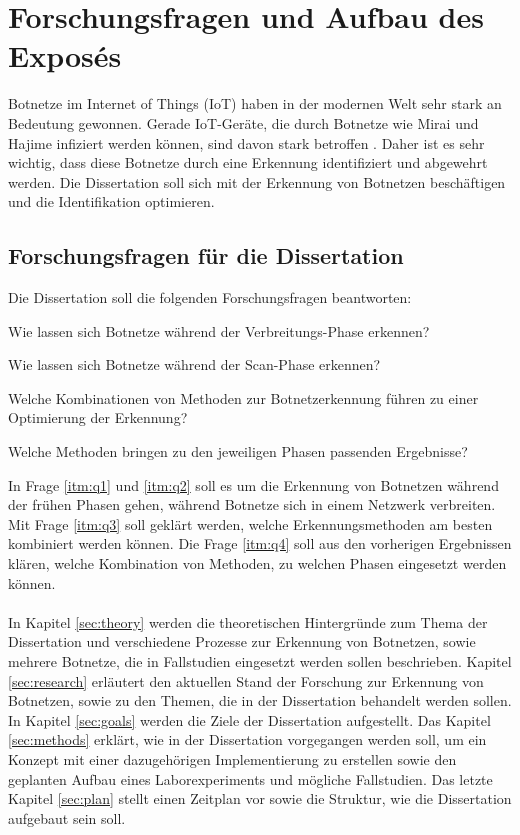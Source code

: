\section{Forschungsfragen und Aufbau des Exposés}

Botnetze im Internet of Things (IoT) haben in der modernen Welt sehr stark an Bedeutung gewonnen. Gerade IoT-Geräte, die
durch Botnetze wie Mirai und Hajime infiziert werden können, sind davon stark betroffen \cite{DBLP:conf/uss/AntonakakisABBB17}.
Daher ist es sehr wichtig, dass diese Botnetze durch eine Erkennung identifiziert und abgewehrt werden. Die Dissertation soll 
sich mit der Erkennung von Botnetzen beschäftigen und die Identifikation optimieren.

\subsection*{Forschungsfragen für die Dissertation}


Die Dissertation soll die folgenden Forschungsfragen beantworten:  

\begin{questions}
    \item Wie lassen sich Botnetze während der Verbreitungs-Phase erkennen? \label{itm:q1}
    \item Wie lassen sich Botnetze während der Scan-Phase erkennen? \label{itm:q2}
    \item Welche Kombinationen von Methoden zur Botnetzerkennung führen zu einer Optimierung der Erkennung? \label{itm:q3}
    \item Welche Methoden bringen zu den jeweiligen Phasen passenden Ergebnisse? \label{itm:q4}
\end{questions}

In Frage \ref{itm:q1} und \ref{itm:q2} soll es um die Erkennung von Botnetzen während der frühen Phasen gehen, während Botnetze sich in einem Netzwerk verbreiten. Mit Frage
\ref{itm:q3} soll geklärt werden, welche Erkennungsmethoden am besten kombiniert werden können. Die Frage \ref{itm:q4} soll aus den vorherigen Ergebnissen klären, welche
Kombination von Methoden, zu welchen Phasen eingesetzt werden können. \\ \\ In Kapitel \ref{sec:theory} werden die theoretischen Hintergründe zum Thema der
Dissertation und verschiedene Prozesse zur Erkennung von Botnetzen, sowie mehrere Botnetze, die in Fallstudien eingesetzt werden sollen beschrieben. Kapitel \ref{sec:research}
erläutert den aktuellen Stand der Forschung zur Erkennung von Botnetzen, sowie zu den Themen, die in der Dissertation behandelt werden sollen. In Kapitel \ref{sec:goals} werden
die Ziele der Dissertation aufgestellt. Das Kapitel \ref{sec:methods} erklärt, wie in der Dissertation vorgegangen werden soll, um ein Konzept mit einer dazugehörigen Implementierung
zu erstellen sowie den geplanten Aufbau eines Laborexperiments und mögliche Fallstudien. Das letzte Kapitel \ref{sec:plan} stellt einen Zeitplan vor sowie die Struktur, wie 
die Dissertation aufgebaut sein soll.
